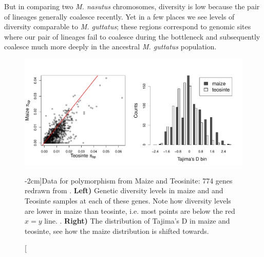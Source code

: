  But in comparing two {\it
  M. nasutus} chromosomes, diversity is low because the pair of lineages generally coalesce
recently. Yet in a few places we see levels of diversity comparable to
{\it M. guttatus}; these regions correspond to genomic sites where our pair of lineages
fail to coalesce during the bottleneck and subsequently coalesce
much more deeply in the ancestral {\it M. guttatus} population.
\begin{figure}
\begin{center}
  \includegraphics[width = \textwidth]{Journal_figs/genetic_drift/Maize_bottleneck/Wright_Tajima_D.pdf}
\end{center}
\caption[][-2cm]{Data for polymorphism from Maize and Teosinite: 774
  genes redrawn from \citet{Wright:05}. {\bf Left)} Genetic  diversity levels in maize and and Teosinte samples at each of these genes.
Note how diversity levels are lower in maize than teosinte, i.e. most
points are below the red $x=y$ line.  
. {\bf Right)} The distribution of Tajima's D in maize and teosinte, see how the maize distribution is shifted towards. } \label{fig:maize_Tajimas_D}  %
\end{figure}
